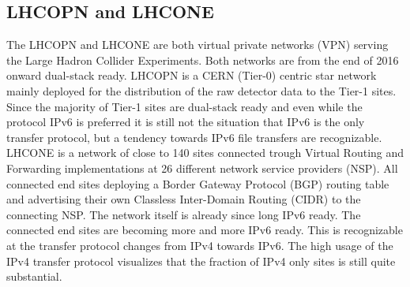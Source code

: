 \subsection{LHCOPN and LHCONE}

The LHCOPN and LHCONE are both virtual private networks (VPN) serving the Large Hadron Collider Experiments. Both networks are from the end of 2016 onward dual-stack ready. LHCOPN is a CERN (Tier-0) centric star network mainly deployed for the distribution of the raw detector data to the Tier-1 sites. Since the majority of Tier-1 sites are dual-stack ready and even while the protocol IPv6 is preferred it is still not the situation that IPv6 is the only transfer protocol, but a tendency towards IPv6 file transfers are recognizable. LHCONE is a network of close to 140 sites connected trough Virtual Routing and Forwarding implementations at 26 different network service providers (NSP). All connected end sites deploying a Border Gateway Protocol (BGP) routing table and advertising their own Classless Inter-Domain Routing (CIDR) to the connecting NSP. The network itself is already since long IPv6 ready. The connected end sites are becoming more and more IPv6 ready. This is recognizable at the  transfer protocol changes from IPv4 towards IPv6. The high usage of the IPv4 transfer protocol visualizes that the fraction of IPv4 only sites is still quite substantial.
